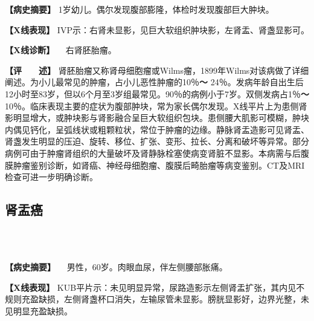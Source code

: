 \textbf{【病史摘要】}
1岁幼儿。偶尔发现腹部膨隆，体检时发现腹部巨大肿块。

\textbf{【X线表现】}
IVP示：右肾未显影，见巨大软组织肿块影，左肾盂、肾盏显影可。

\textbf{【X线诊断】} 　右肾胚胎瘤。

\textbf{【评　　述】}
肾胚胎瘤又称肾母细胞瘤或Wilms瘤，1899年Wilms对该病做了详细阐述。为小儿最常见的肿瘤，占小儿恶性肿瘤的10％\textbf{～}
24％。发病年龄自出生后12小时至83岁，但以6个月至3岁组最常见。90％的病例小于7岁。双侧发病占1％\textbf{～}
10％。临床表现主要的症状为腹部肿块，常为家长偶尔发现。X线平片上为患侧肾影明显增大，或肿块影与肾影融合呈巨大软组织包块。患侧腰大肌影可模糊，肿块内偶见钙化，呈弧线状或粗颗粒状，常位于肿瘤的边缘。静脉肾盂造影可见肾盂、肾盏发生明显的压迫、旋转、移位、扩张、变形、拉长、分离和破坏等异常。部分病例可由于肿瘤肾组织的大量破坏及肾静脉栓塞使病变肾脏不显影。本病需与后腹膜肿瘤鉴别诊断，如肾癌、神经母细胞瘤、腹膜后畸胎瘤等病变鉴别。CT及MRI检查可进一步明确诊断。

\subsection{肾盂癌}

\begin{figure}
    \centering
    \\
    \\
    \caption{}
    \label{fig6-5-3}
\end{figure}

\textbf{【病史摘要】} 　男性，60岁。肉眼血尿，伴左侧腰部胀痛。

\textbf{【X线表现】}
KUB平片示：未见明显异常，尿路造影示左侧肾盂扩张，其内见不规则充盈缺损，左侧肾盏杯口消失，左输尿管未显影。膀胱显影好，边界光整，未见明显充盈缺损。

